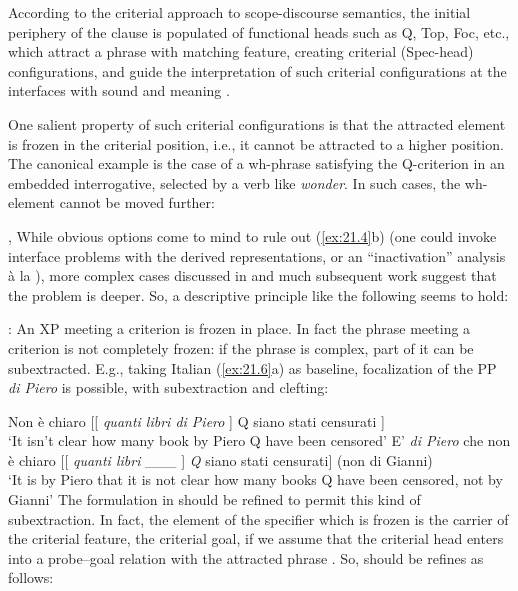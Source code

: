 \documentclass[output=paper]{langsci/langscibook}
\begin{document}
According to the criterial approach  to scope-discourse semantics, the initial
periphery of the clause is populated of functional heads such as Q, Top, Foc,
etc., which attract a phrase with matching feature, creating criterial
(Spec-head) configurations, and guide the interpretation of such criterial
configurations at the interfaces with sound and meaning \citep{Rizzi1997}.

One salient property of such criterial configurations is that the attracted
element is frozen in the criterial position, i.e., it cannot be attracted to a
higher position. The canonical example is the case of a wh-phrase satisfying
the Q-criterion in an embedded interrogative, selected by a verb like
\emph{wonder}. In such cases, the wh-element cannot be moved further:

\ea%
    \label{ex:21.4} \textcite{LasnikSaito1992}, \textcite{Boskovic2008}
    \z
\z
%
While obvious options come to mind to rule out (\ref{ex:21.4}b) (one could
invoke interface problems with the derived representations, or an
“inactivation” analysis à la \citealt{Boskovic2008}), more complex cases
discussed in \textcite{rizzicriterial,Rizzi2011} and much subsequent work suggest that the
problem is deeper. So, a descriptive principle like the following seems to
hold:

\ea%
    \label{ex:21.5}
    : An XP meeting a criterion is frozen in place.
\z
%
In fact the phrase meeting a criterion is not completely frozen: if the phrase
is complex, part of it can be subextracted. E.g., taking Italian
(\ref{ex:21.6}a) as baseline, focalization of the PP \emph{di Piero} is
possible, with subextraction and clefting:\pagebreak

\ea%
    \label{ex:21.6}
    \ea Non è chiaro   [[ \emph{quanti libri di Piero} ] Q siano stati censurati ]\\
        ‘It isn’t clear       how many book by Piero Q have been censored’
    \ex E’ \emph{di Piero} che non è chiaro [[ \emph{quanti libri} \_\_\_ ] \emph{Q}  siano stati censurati] (non di Gianni)\\
        ‘It is by Piero that it is not clear how many books Q have been censored, not by Gianni’
    \z
\z
%
The formulation in  should be refined to permit this kind of
subextraction. In fact, the element of the specifier which is frozen is the
carrier of the criterial feature, the criterial goal, if we assume that the
criterial head enters into a probe--goal relation with the attracted phrase
\citep{Chomsky2000}. So,  should be refines as follows:
\end{document}
